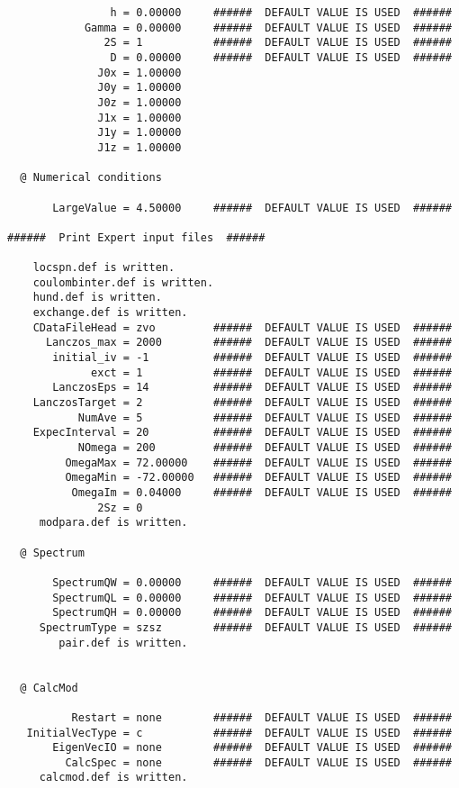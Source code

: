 \begin{verbatim}
                h = 0.00000     ######  DEFAULT VALUE IS USED  ######
            Gamma = 0.00000     ######  DEFAULT VALUE IS USED  ######
               2S = 1           ######  DEFAULT VALUE IS USED  ######
                D = 0.00000     ######  DEFAULT VALUE IS USED  ######
              J0x = 1.00000
              J0y = 1.00000
              J0z = 1.00000
              J1x = 1.00000
              J1y = 1.00000
              J1z = 1.00000

  @ Numerical conditions

       LargeValue = 4.50000     ######  DEFAULT VALUE IS USED  ######

######  Print Expert input files  ######

    locspn.def is written.
    coulombinter.def is written.
    hund.def is written.
    exchange.def is written.
    CDataFileHead = zvo         ######  DEFAULT VALUE IS USED  ######
      Lanczos_max = 2000        ######  DEFAULT VALUE IS USED  ######
       initial_iv = -1          ######  DEFAULT VALUE IS USED  ######
             exct = 1           ######  DEFAULT VALUE IS USED  ######
       LanczosEps = 14          ######  DEFAULT VALUE IS USED  ######
    LanczosTarget = 2           ######  DEFAULT VALUE IS USED  ######
           NumAve = 5           ######  DEFAULT VALUE IS USED  ######
    ExpecInterval = 20          ######  DEFAULT VALUE IS USED  ######
           NOmega = 200         ######  DEFAULT VALUE IS USED  ######
         OmegaMax = 72.00000    ######  DEFAULT VALUE IS USED  ######
         OmegaMin = -72.00000   ######  DEFAULT VALUE IS USED  ######
          OmegaIm = 0.04000     ######  DEFAULT VALUE IS USED  ######
              2Sz = 0
     modpara.def is written.

  @ Spectrum

       SpectrumQW = 0.00000     ######  DEFAULT VALUE IS USED  ######
       SpectrumQL = 0.00000     ######  DEFAULT VALUE IS USED  ######
       SpectrumQH = 0.00000     ######  DEFAULT VALUE IS USED  ######
     SpectrumType = szsz        ######  DEFAULT VALUE IS USED  ######
        pair.def is written.


  @ CalcMod

          Restart = none        ######  DEFAULT VALUE IS USED  ######
   InitialVecType = c           ######  DEFAULT VALUE IS USED  ######
       EigenVecIO = none        ######  DEFAULT VALUE IS USED  ######
         CalcSpec = none        ######  DEFAULT VALUE IS USED  ######
     calcmod.def is written.


\end{verbatim}
